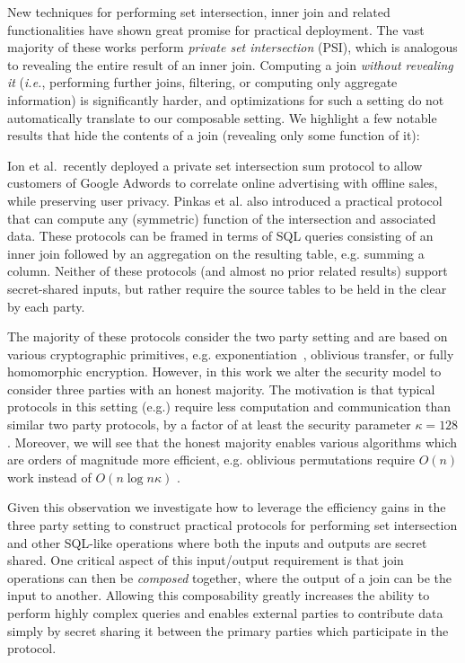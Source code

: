 \documentclass[11pt,letterpaper]{article}
\newcommand{\ie}{{\sl i.e.}\xspace}
\begin{document}
New techniques \cite{usenix:PSZ14,USENIX:PSSZ15,PSZ16,CCS:KKRT16,PSWW18,CLR17,CHLR18,cryptoeprint:2017:738,RA17,KLSAP17,OOS17,KMPRT17} for performing set intersection, inner join and related functionalities have shown great promise for practical deployment. 
The vast majority of these works perform {\em private set intersection} (PSI), which is analogous to revealing the entire result of an inner join.
Computing a join {\em without revealing it} (\ie, performing further joins, filtering, or computing only aggregate information) is significantly harder, and optimizations for such a setting do not automatically translate to our composable setting.
We highlight a few notable results that hide the contents of a join (revealing only some function of it):

Ion et al.\ recently deployed a private set intersection sum protocol\cite{cryptoeprint:2017:738} to allow customers of Google Adwords to correlate online advertising with offline sales, while preserving user privacy. Pinkas et al. \cite{PSWW18} also introduced a practical protocol that can compute any (symmetric) function of the intersection and associated data. These protocols can be framed in terms of SQL queries consisting of an inner join followed by an aggregation on the resulting table, e.g. summing a column.  
Neither of these protocols (and almost no prior related results) support secret-shared inputs, but rather require the source tables to be held in the clear by each party.

The majority of these protocols consider the two party setting and are based on various cryptographic primitives, e.g. exponentiation~\cite{cryptoeprint:2017:738}, oblivious transfer\cite{PSWW18}, or fully homomorphic encryption\cite{CLR17}. However, in this work we alter the security model to consider three parties with an honest majority. The motivation is that typical protocols in this setting (e.g.\cite{highthroughput}) require less computation and communication than similar two party protocols, by a factor of at least the security parameter $\kappa=128$. Moreover, we will see that the honest majority enables various algorithms which are orders of magnitude more efficient, e.g. oblivious permutations require $O(n)$ work instead of $O(n\log n \kappa)$ \cite{MS13}. 

Given this observation we investigate how to leverage the efficiency gains in the three party setting to construct practical protocols for performing set intersection and other SQL-like operations where both the inputs and outputs are secret shared. One critical aspect of this input/output requirement is that join operations can then be \emph{composed} together, where the output of a join can be the input to another. Allowing this composability greatly increases the ability to perform highly complex queries and enables external parties to contribute data simply by secret sharing it between the primary parties which participate in the protocol.
\end{document}
